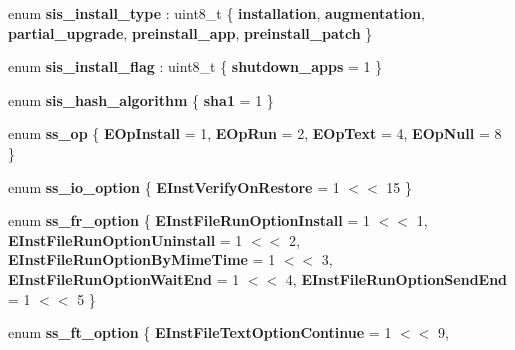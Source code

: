 \begin{DoxyCompactItemize}
\mbox{\label{namespaceeka2l1_1_1loader_a2992ba958a879a5987e9fde570b56cbc}} 
enum {\bfseries sis\+\_\+install\+\_\+type} \+: uint8\+\_\+t \{ \newline
{\bfseries installation}, 
{\bfseries augmentation}, 
{\bfseries partial\+\_\+upgrade}, 
{\bfseries preinstall\+\_\+app}, 
\newline
{\bfseries preinstall\+\_\+patch}
 \}
\item 
\mbox{\label{namespaceeka2l1_1_1loader_adc17fc9c14acdf0101494ca2c0d8bd6c}} 
enum {\bfseries sis\+\_\+install\+\_\+flag} \+: uint8\+\_\+t \{ {\bfseries shutdown\+\_\+apps} = 1
 \}
\item 
\mbox{\label{namespaceeka2l1_1_1loader_a843d5f6460fc19b311666e52a232acc1}} 
enum {\bfseries sis\+\_\+hash\+\_\+algorithm} \{ {\bfseries sha1} = 1
 \}
\item 
\mbox{\label{namespaceeka2l1_1_1loader_a8436fd3ae410280d8da22db965eb80b2}} 
enum {\bfseries ss\+\_\+op} \{ {\bfseries E\+Op\+Install} = 1, 
{\bfseries E\+Op\+Run} = 2, 
{\bfseries E\+Op\+Text} = 4, 
{\bfseries E\+Op\+Null} = 8
 \}
\item 
\mbox{\label{namespaceeka2l1_1_1loader_a7f18b6624cc93f68a974aeec116f1767}} 
enum {\bfseries ss\+\_\+io\+\_\+option} \{ {\bfseries E\+Inst\+Verify\+On\+Restore} = 1 $<$$<$ 15
 \}
\item 
\mbox{\label{namespaceeka2l1_1_1loader_a02a575b6b9f981f163004ea2b786e91e}} 
enum {\bfseries ss\+\_\+fr\+\_\+option} \{ \newline
{\bfseries E\+Inst\+File\+Run\+Option\+Install} = 1 $<$$<$ 1, 
{\bfseries E\+Inst\+File\+Run\+Option\+Uninstall} = 1 $<$$<$ 2, 
{\bfseries E\+Inst\+File\+Run\+Option\+By\+Mime\+Time} = 1 $<$$<$ 3, 
{\bfseries E\+Inst\+File\+Run\+Option\+Wait\+End} = 1 $<$$<$ 4, 
\newline
{\bfseries E\+Inst\+File\+Run\+Option\+Send\+End} = 1 $<$$<$ 5
 \}
\item 
\mbox{\label{namespaceeka2l1_1_1loader_a1b58d906784d22c06dbbb529e39df31f}} 
enum {\bfseries ss\+\_\+ft\+\_\+option} \{ {\bfseries E\+Inst\+File\+Text\+Option\+Continue} = 1 $<$$<$ 9, 
$$
\end{DoxyCompactItemize}
